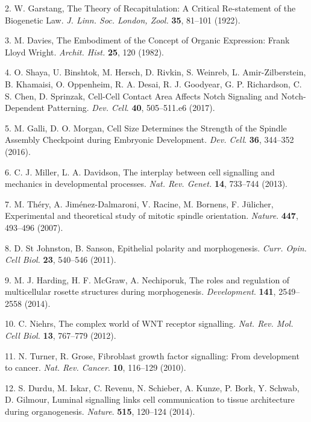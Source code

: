 \documentclass[11pt,singlespacinge,twoside]{reedthesis} %
\begin{document}
\leavevmode\hypertarget{ref-Garstang1922}{}%
2. W. Garstang, The Theory of Recapitulation: A Critical Re-statement of the Biogenetic Law. \emph{J. Linn. Soc. London, Zool.} \textbf{35}, 81--101 (1922).

\leavevmode\hypertarget{ref-Davies1982}{}%
3. M. Davies, The Embodiment of the Concept of Organic Expression: Frank Lloyd Wright. \emph{Archit. Hist.} \textbf{25}, 120 (1982).

\leavevmode\hypertarget{ref-Shaya2017a}{}%
4. O. Shaya, U. Binshtok, M. Hersch, D. Rivkin, S. Weinreb, L. Amir-Zilberstein, B. Khamaisi, O. Oppenheim, R. A. Desai, R. J. Goodyear, G. P. Richardson, C. S. Chen, D. Sprinzak, Cell-Cell Contact Area Affects Notch Signaling and Notch-Dependent Patterning. \emph{Dev. Cell}. \textbf{40}, 505--511.e6 (2017).

\leavevmode\hypertarget{ref-Galli2016}{}%
5. M. Galli, D. O. Morgan, Cell Size Determines the Strength of the Spindle Assembly Checkpoint during Embryonic Development. \emph{Dev. Cell}. \textbf{36}, 344--352 (2016).

\leavevmode\hypertarget{ref-Miller2013}{}%
6. C. J. Miller, L. A. Davidson, The interplay between cell signalling and mechanics in developmental processes. \emph{Nat. Rev. Genet.} \textbf{14}, 733--744 (2013).

\leavevmode\hypertarget{ref-Thery2007}{}%
7. M. Théry, A. Jiménez-Dalmaroni, V. Racine, M. Bornens, F. Jülicher, Experimental and theoretical study of mitotic spindle orientation. \emph{Nature}. \textbf{447}, 493--496 (2007).

\leavevmode\hypertarget{ref-StJohnston2011}{}%
8. D. St Johnston, B. Sanson, Epithelial polarity and morphogenesis. \emph{Curr. Opin. Cell Biol.} \textbf{23}, 540--546 (2011).

\leavevmode\hypertarget{ref-Harding2014b}{}%
9. M. J. Harding, H. F. McGraw, A. Nechiporuk, The roles and regulation of multicellular rosette structures during morphogenesis. \emph{Development}. \textbf{141}, 2549--2558 (2014).

\leavevmode\hypertarget{ref-Niehrs2012}{}%
10. C. Niehrs, The complex world of WNT receptor signalling. \emph{Nat. Rev. Mol. Cell Biol.} \textbf{13}, 767--779 (2012).

\leavevmode\hypertarget{ref-Turner2010}{}%
11. N. Turner, R. Grose, Fibroblast growth factor signalling: From development to cancer. \emph{Nat. Rev. Cancer}. \textbf{10}, 116--129 (2010).

\leavevmode\hypertarget{ref-Durdu2014a}{}%
12. S. Durdu, M. Iskar, C. Revenu, N. Schieber, A. Kunze, P. Bork, Y. Schwab, D. Gilmour, Luminal signalling links cell communication to tissue architecture during organogenesis. \emph{Nature}. \textbf{515}, 120--124 (2014).
\end{document}
